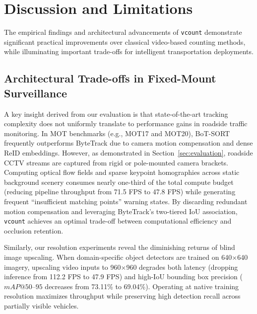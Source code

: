 \section{Discussion and Limitations}
\label{sec:discussion}

The empirical findings and architectural advancements of \texttt{vcount} demonstrate significant practical improvements over classical video-based counting methods, while illuminating important trade-offs for intelligent transportation deployments.

\subsection{Architectural Trade-offs in Fixed-Mount Surveillance}
A key insight derived from our evaluation is that state-of-the-art tracking complexity does not uniformly translate to performance gains in roadside traffic monitoring. In MOT benchmarks (e.g., MOT17 and MOT20), BoT-SORT frequently outperforms ByteTrack due to camera motion compensation and dense ReID embeddings. However, as demonstrated in Section~\ref{sec:evaluation}, roadside CCTV streams are captured from rigid or pole-mounted camera brackets. Computing optical flow fields and sparse keypoint homographies across static background scenery consumes nearly one-third of the total compute budget (reducing pipeline throughput from 71.5 FPS to 47.8 FPS) while generating frequent ``insufficient matching points'' warning states. By discarding redundant motion compensation and leveraging ByteTrack's two-tiered IoU association, \texttt{vcount} achieves an optimal trade-off between computational efficiency and occlusion retention.

Similarly, our resolution experiments reveal the diminishing returns of blind image upscaling. When domain-specific object detectors are trained on 640$\times$640 imagery, upscaling video inputs to 960$\times$960 degrades both latency (dropping inference from 112.2 FPS to 47.9 FPS) and high-IoU bounding box precision ($mAP@50$--$95$ decreases from 73.11\% to 69.04\%). Operating at native training resolution maximizes throughput while preserving high detection recall across partially visible vehicles.


